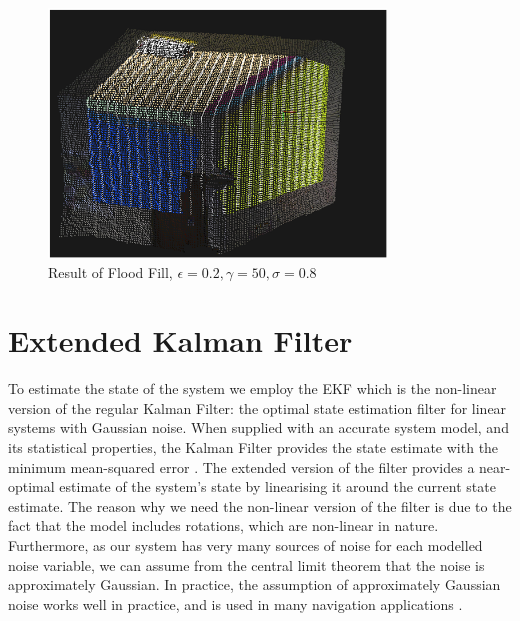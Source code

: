 \documentclass[]{article}
\begin{document}
{\begin{figure}[p]
	\centering
	\label{fig:dbscan_planes}
 	\includegraphics[width=0.8\textwidth]{floodFill.png}

	\caption{Result of Flood Fill, $\epsilon=0.2, \gamma=50, \sigma=0.8$}
	\label{fig:flood_fill}

\end{figure}


\clearpage


\clearpage %
\section{Extended Kalman Filter} %
\label{sec:ekf}

To estimate the state of the system we employ the EKF which is the non-linear version of the regular Kalman Filter: the optimal state estimation filter for linear systems \cite{todo} with Gaussian noise.
When supplied with an accurate system model, and its statistical properties, the Kalman Filter provides the state estimate with the minimum mean-squared error \cite{todo}.
The extended version of the filter provides a near-optimal estimate of the system's state by linearising it around the current state estimate.
The reason why we need the non-linear version of the filter is due to the fact that the model includes rotations, which are non-linear in nature.
Furthermore, as our system has very many sources of noise for each modelled noise variable, we can assume from the central limit theorem that the noise is approximately Gaussian.
In practice, the assumption of approximately Gaussian noise works well in practice, and is used in many navigation applications \cite{todo}.

}
\end{document}

